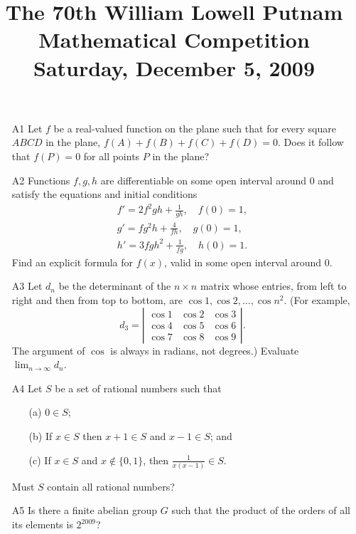 \documentclass[amssymb,twocolumn,pra,10pt,aps]{revtex4-1}
\begin{document}
\title{The 70th William Lowell Putnam Mathematical Competition \\
    Saturday, December 5, 2009}
\maketitle

\begin{itemize}

\item[A1]
Let $f$ be a real-valued function on the plane such that for every
square $ABCD$ in the plane, $f(A)+f(B)+f(C)+f(D)=0$. Does it follow that
$f(P)=0$ for all points $P$ in the plane?

\item[A2]
Functions $f,g,h$ are differentiable on some open interval around $0$
and satisfy the equations and initial conditions
\begin{gather*}
f' = 2f^2gh+\frac{1}{gh},\quad f(0)=1, \\
g'=fg^2h+\frac{4}{fh}, \quad g(0)=1, \\
h'=3fgh^2+\frac{1}{fg}, \quad h(0)=1.
\end{gather*}
Find an explicit formula for $f(x)$, valid in some open interval around $0$.

\item[A3]
Let $d_n$ be the determinant of the $n \times n$ matrix whose entries, from
left to right and then from top to bottom, are $\cos 1, \cos 2, \dots, \cos
n^2$. (For example,
\[
 d_3 = \left| \begin{matrix} \cos 1 & \cos 2 & \cos 3 \\
               \cos 4 & \cos 5 & \cos 6 \\
\cos 7 & \cos 8 & \cos 9
              \end{matrix} \right|.
\]
The argument of $\cos$ is always in radians, not degrees.) Evaluate
$\lim_{n\to\infty} d_n$.

\item[A4]
Let $S$ be a set of rational numbers such that
\begin{enumerate}
\item[(a)] $0 \in S$;
\item[(b)] If $x \in S$ then $x+1\in S$ and $x-1\in S$; and
\item[(c)] If $x\in S$ and $x\not\in\{0,1\}$, then $\frac{1}{x(x-1)}\in S$.
\end{enumerate}
Must $S$ contain all rational numbers?

\item[A5]
Is there a finite abelian group $G$ such that the product of the
orders of all its elements is $2^{2009}$?


\end{itemize}
\end{document}
